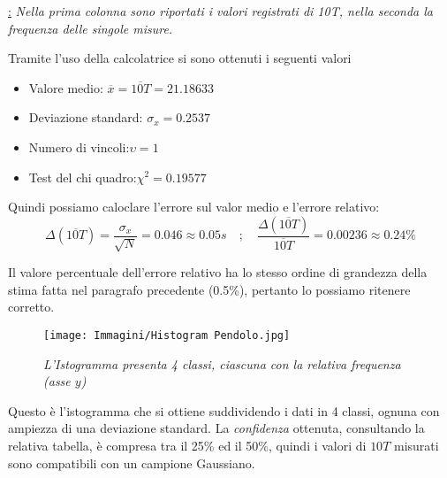\documentclass[12pt, a4paper]{article}
\begin{document}
\begin{center}
   \href{Tabella 1} : \textit{\footnotesize{Nella prima colonna sono riportati i valori registrati di 10T, nella seconda la frequenza delle singole misure.}}
\end{center}
\addvspace{2cm}


Tramite l'uso della calcolatrice si sono ottenuti i seguenti valori
\smallskip

\begin{itemize}
    \item\phantom{a} Valore medio:\phantom{aaaaaaaaa.aa}
          $\overline{x}=\overline{10T}=21.18633$
    \item\phantom{a} Deviazione standard:\phantom{aaaaa}
        $\sigma_x=0.2537$
    \item\phantom{a} Numero di vincoli:\phantom{aaaaaaaa}$\upsilon=1$
    \item\phantom{a} Test del chi quadro:\phantom{aaaaaaa}$\chi^2=0.19577$ 
\end{itemize}
\bigskip

Quindi possiamo caloclare l'errore sul valor medio e l'errore relativo:
\begin{equation*}
    \Delta (\overline{10T})=\frac{\sigma_x}{\sqrt{N}}=0.046\approx 0.05s \quad ; \quad \frac{\Delta(\overline{10T})}{\overline{10T}} = 0.00236 \approx 0.24\%
\end{equation*}

Il valore percentuale dell'errore relativo ha lo stesso ordine di grandezza della stima fatta nel paragrafo precedente (0.5\%), pertanto lo possiamo ritenere corretto.



\newpage
\begin{figure}[h!]
    \centering
    \texttt{[image: Immagini/Histogram Pendolo.jpg]}
    \caption{\textit{{\footnotesize{L'Istogramma presenta 4 classi, ciascuna con la relativa frequenza (asse $y$) }}}}
    \label{Grafico parabolico}
\end{figure}

\bigskip
Questo è l'istogramma che si ottiene suddividendo i dati in 4 classi, ognuna con ampiezza di una deviazione standard.
La \textit{confidenza} ottenuta, consultando la relativa tabella, è compresa tra il 25\% ed il 50\%, quindi i valori di $10T$ misurati sono compatibili con un campione Gaussiano.
\bigskip
\end{document}
